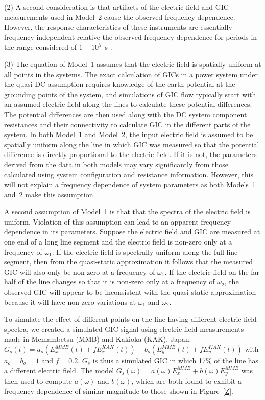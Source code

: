 \documentclass[draft,linenumbers]{agujournal2018}
\begin{document}
(2) A second consideration is that artifacts of the electric field and GIC measurements used in Model~2 cause the observed frequency dependence. However, the response characteristics of these instruments are essentially frequency independent relative the observed frequency dependence for periods in the range considered of $1-10^{5}$~s \citep{Simpson2005}. 

(3) The equation of Model~1 assumes that the electric field is spatially uniform at all points in the systems. The exact calculation of GICs in a power system under the quasi-DC assumption requires knowledge of the earth potential at the grounding points of the system, and simulations of GIC flow \citep{Albertson1981,Lehtinen1985} typically start with an assumed electric field along the lines to calculate these potential differences. The potential differences are then used along with the DC system component resistances and their connectivity to calculate GIC in the different parts of the system. In both Model~1 and Model~2, the input electric field is assumed to be spatially uniform along the line in which GIC was measured so that the potential difference is directly proportional to the electric field. If it is not, the parameters derived from the data in both models may vary significantly from those calculated using system configuration and resistance information. However, this will not explain a frequency dependence of system parameters as both Models~1 and~2 make this assumption.

A second assumption of Model~1 is that that the spectra of the electric field is uniform. Violation of this assumption can lead to an apparent frequency dependence in its parameters. Suppose the electric field and GIC are measured at one end of a long line segment and the electric field is non-zero only at a frequency of $\omega_1$. If the electric field is spectrally uniform along the full line segment, then from the quasi-static approximation it follows that the measured GIC will also only be non-zero at a frequency of $\omega_1$. If the electric field on the far half of the line changes so that it is non-zero only at a frequency of $\omega_2$, the observed GIC will appear to be inconsistent with the quasi-static approximation because it will have non-zero variations at $\omega_1$ and $\omega_2$.

To simulate the effect of different points on the line having different electric field spectra, we created a simulated GIC signal using electric field measurements made in Memambetsu (MMB) and Kakioka (KAK), Japan: $G_s(t)=a_o(E^{MMB}_x(t) + fE^{KAK}_x(t))+b_o(E^{MMB}_y(t) + fE^{KAK}_y(t))$ with $a_o=b_o=1$ and $f=0.2$. $G_s$ is thus a simulated GIC in which 17\% of the line has a different electric field. The model $G_s(\omega)=a(\omega)E^{MMB}_x+b(\omega)E^{MMB}_y$ was then used to compute $a(\omega)$ and $b(\omega)$, which are both found to exhibit a frequency dependence of similar magnitude to those shown in Figure~\ref{Z}.
\end{document}
